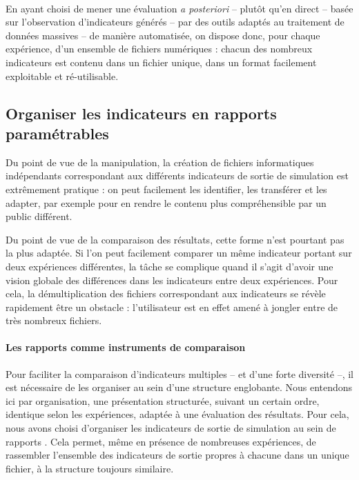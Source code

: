 	\paragraph*{}
	En ayant choisi de mener une évaluation \textit{a posteriori} -- plutôt qu'en direct -- basée sur l'observation d'indicateurs générés -- par des outils adaptés au traitement de données massives -- de manière automatisée, on dispose donc, pour chaque expérience, d'un ensemble de fichiers numériques : chacun des nombreux indicateurs est contenu dans un fichier unique, dans un format facilement exploitable et ré-utilisable. 

	\subsection{Organiser les indicateurs en rapports paramétrables}

	Du point de vue de la manipulation, la création de fichiers informatiques indépendants correspondant aux différents indicateurs de sortie de simulation est extrêmement pratique : on peut facilement les identifier, les transférer et les adapter, par exemple pour en rendre le contenu plus compréhensible par un public différent.

	Du point de vue de la comparaison des résultats, cette forme n'est pourtant pas la plus adaptée.
	Si l'on peut facilement comparer un même indicateur portant sur deux expériences différentes, la tâche se complique quand il s'agit d'avoir une vision globale des différences dans les indicateurs entre deux expériences.
	Pour cela, la démultiplication des fichiers correspondant aux indicateurs se révèle rapidement être un obstacle : l'utilisateur est en effet amené à jongler entre de très nombreux fichiers.
	
	\paragraph{Les rapports comme instruments de comparaison}

	Pour faciliter la comparaison d'indicateurs multiples -- et d'une forte diversité --, il est nécessaire de les organiser au sein d'une structure englobante.
	Nous entendons ici par organisation, une présentation structurée, suivant un certain ordre, identique selon les expériences, adaptée à une évaluation des résultats.
	Pour cela, nous avons choisi d'organiser les indicateurs de sortie de simulation au sein de \og rapports \fg{}.
	Cela permet, même en présence de nombreuses expériences, de rassembler l'ensemble des indicateurs de sortie propres à chacune dans un unique fichier, à la structure toujours similaire.

